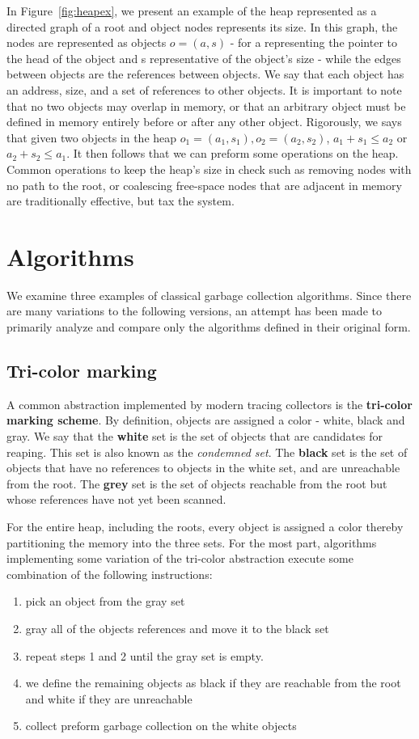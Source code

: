 \documentclass[11pt,leqno]{article}
\newcommand{\mydef}[1]{\textbf{#1}}
\begin{document}
In Figure~\ref{fig:heapex}, we present an example of the heap represented as a directed graph of a root and object nodes represents its size. In this graph, the nodes are represented as objects $o=(a,s)$ - for a representing the pointer to the head of the object and s representative of the object's size - while the edges between objects are the references between objects. We say that each object has an address, size, and a set of references to other objects. It is important to note that no two objects may overlap in memory, or that an arbitrary object must be defined in memory entirely before or after any other object. Rigorously, we says that given two objects in the heap $o_1 = (a_1, s_1), o_2 = (a_2, s_2)$, $a_1+s_1 \leq a_2$ or $a_2+s_2 \leq a_1$. It then follows that we can preform some operations on the heap. Common operations to keep the heap's size in check such as removing nodes with no path to the root, or coalescing free-space nodes that are adjacent in memory are traditionally effective, but tax the system.
    
\section{Algorithms}
We examine three examples of classical garbage collection algorithms. Since there are many variations to the following versions, an attempt has been made to primarily analyze and compare only the algorithms defined in their original form.  

\subsection{Tri-color marking}
A common abstraction implemented by modern tracing collectors is the \mydef{tri-color marking scheme}\cite{wiki:garbage_collection}. By definition, objects are assigned a color - white, black and gray. We say that the
\textbf{white} set is the set of objects that are candidates for reaping. This set is also known as the \textit{condemned set}. 
The \textbf{black} set is the set of objects that have no references to objects in the white set, and are unreachable from the root. The \textbf{grey} set is the set of objects reachable from the root but whose references have not yet been scanned.

For the entire heap, including the roots, every object is assigned a color thereby partitioning the memory into the three sets. For the most part, algorithms implementing some variation of the tri-color abstraction execute some combination of the following instructions: 
\begin{enumerate}
  \item pick an object from the gray set
  \item gray all of the objects references and move it to the black set
  \item repeat steps 1 and 2 until the gray set is empty.
  \item we define the remaining objects as black if they are reachable from the root and white if they are unreachable
  \item collect preform garbage collection on the white objects
\end{enumerate}
\end{document}
